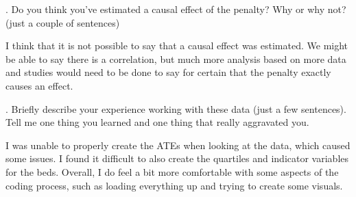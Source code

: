 \documentclass[
  letterpaper,
  DIV=11,
  numbers=noendperiod]{scrartcl}
\begin{document}
\newpage

. Do you think you've estimated a causal effect of the
penalty? Why or why not? (just a couple of sentences)

I think that it is not possible to say that a causal effect was
estimated. We might be able to say there is a correlation, but much more
analysis based on more data and studies would need to be done to say for
certain that the penalty exactly causes an effect.

\newpage

. Briefly describe your experience working with these data
(just a few sentences). Tell me one thing you learned and one thing that
really aggravated you.

I was unable to properly create the ATEs when looking at the data, which
caused some issues. I found it difficult to also create the quartiles
and indicator variables for the beds. Overall, I do feel a bit more
comfortable with some aspects of the coding process, such as loading
everything up and trying to create some visuals.
\end{document}
